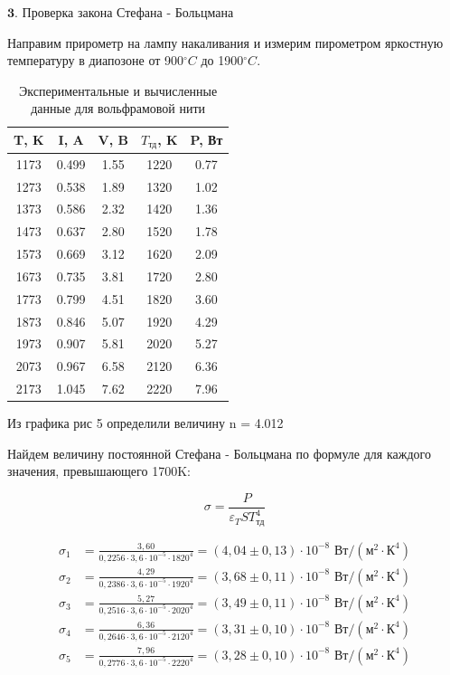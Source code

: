 \documentclass[a4paper]{article}
\begin{document}
$\textbf{3. Проверка закона Стефана - Больцмана}$ \par

Направим прирометр на лампу накаливания и измерим пирометром яркостную температуру в диапозоне от 900$^{\circ} C $ до 1900$^{\circ} C $. 

\begin{table}[h]
\centering
\begin{tabular}{|c|c|c|c|c|}
\hline
T, K & I, A & V, B & $T_{\text{тд}}$, K & P, Вт \\
\hline
1173 & 0.499 & 1.55 & 1220 & 0.77 \\
\hline
1273 & 0.538 & 1.89 & 1320 & 1.02 \\
\hline
1373 & 0.586 & 2.32 & 1420 & 1.36 \\
\hline
1473 & 0.637 & 2.80 & 1520 & 1.78 \\
\hline
1573 & 0.669 & 3.12 & 1620 & 2.09 \\
\hline
1673 & 0.735 & 3.81 & 1720 & 2.80 \\
\hline
1773 & 0.799 & 4.51 & 1820 & 3.60 \\
\hline
1873 & 0.846 & 5.07 & 1920 & 4.29 \\
\hline
1973 & 0.907 & 5.81 & 2020 & 5.27 \\
\hline
2073 & 0.967 & 6.58 & 2120 & 6.36 \\
\hline
2173 & 1.045 & 7.62 & 2220 & 7.96 \\
\hline
\end{tabular}
\caption{Экспериментальные и вычисленные данные для вольфрамовой нити}
\label{tab:data_full}
\end{table}

Из графика рис 5 определили величину n = 4.012\par

Найдем величину постоянной Стефана - Больцмана по формуле для каждого значения, превышающего 1700K:

\[\sigma = \frac{P}{\varepsilon_{T}ST_\text{тд}^{4}}\]

\begin{align*}
\sigma_1 &= \frac{3{,}60}{0{,}2256 \cdot 3{,}6 \cdot 10^{-5} \cdot 1820^4} = (4{,}04 \pm 0{,}13) \cdot 10^{-8} \text{ Вт}/(\text{м}^2 \cdot \text{К}^4) \\
\sigma_2 &= \frac{4{,}29}{0{,}2386 \cdot 3{,}6 \cdot 10^{-5} \cdot 1920^4} = (3{,}68 \pm 0{,}11) \cdot 10^{-8} \text{ Вт}/(\text{м}^2 \cdot \text{К}^4) \\
\sigma_3 &= \frac{5{,}27}{0{,}2516 \cdot 3{,}6 \cdot 10^{-5} \cdot 2020^4} = (3{,}49 \pm 0{,}11) \cdot 10^{-8} \text{ Вт}/(\text{м}^2 \cdot \text{К}^4) \\
\sigma_4 &= \frac{6{,}36}{0{,}2646 \cdot 3{,}6 \cdot 10^{-5} \cdot 2120^4} = (3{,}31 \pm 0{,}10) \cdot 10^{-8} \text{ Вт}/(\text{м}^2 \cdot \text{К}^4) \\
\sigma_5 &= \frac{7{,}96}{0{,}2776 \cdot 3{,}6 \cdot 10^{-5} \cdot 2220^4} = (3{,}28 \pm 0{,}10) \cdot 10^{-8} \text{ Вт}/(\text{м}^2 \cdot \text{К}^4)
\end{align*}
\end{document}
